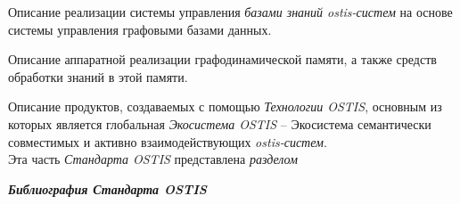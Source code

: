 \begin{SCn}
{\begin{scnitemize}
\begin{scnitemizeii}
				\item Описание реализации системы управления \textit{базами знаний
					ostis-систем} на основе системы управления графовыми базами данных.
				\item Описание аппаратной реализации графодинамической памяти, а также
				средств обработки знаний в этой памяти.
			\end{scnitemizeii}
			\item Описание продуктов, создаваемых с помощью \textit{Технологии
				OSTIS}, основным из которых является глобальная \textit{Экосистема OSTIS} --
			Экосистема семантически совместимых и активно взаимодействующих
			\textit{ostis-систем}.\\Эта часть \textit{Стандарта OSTIS} представлена
			\textit{разделом} 
			\item \textit{\textbf{Библиография Стандарта OSTIS}}
		\end{scnitemize}
	}
\end{SCn}